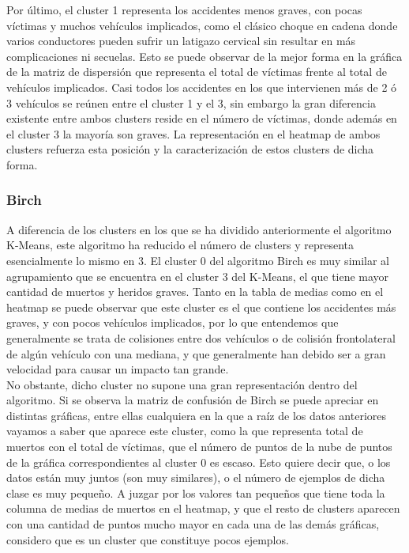 	Por último, el cluster 1 representa los accidentes menos graves, con pocas víctimas y muchos vehículos implicados, como el clásico choque en cadena donde varios conductores pueden sufrir un latigazo cervical sin resultar en más complicaciones ni secuelas. Esto se puede observar de la mejor forma en la gráfica de la matriz de dispersión que representa el total de víctimas frente al total de vehículos implicados. Casi todos los accidentes en los que intervienen más de 2 ó 3 vehículos se reúnen entre el cluster 1 y el 3, sin embargo la gran diferencia existente entre ambos clusters reside en el número de víctimas, donde además en el cluster 3 la mayoría son graves. La representación en el heatmap de ambos clusters refuerza esta posición y la caracterización de estos clusters de dicha forma.
	
	\subsubsection{Birch}
	A diferencia de los clusters en los que se ha dividido anteriormente el algoritmo K-Means, este algoritmo ha reducido el número de clusters y representa esencialmente lo mismo en 3. El cluster 0 del algoritmo Birch es muy similar al agrupamiento que se encuentra en el cluster 3 del K-Means, el que tiene mayor cantidad de muertos y heridos graves. Tanto en la tabla de medias como en el heatmap se puede observar que este cluster es el que contiene los accidentes más graves, y con pocos vehículos implicados, por lo que entendemos que generalmente se trata de colisiones entre dos vehículos o de colisión frontolateral de algún vehículo con una mediana, y que generalmente han debido ser a gran velocidad para causar un impacto tan grande.\\
	
	No obstante, dicho cluster no supone una gran representación dentro del algoritmo. Si se observa la matriz de confusión de Birch se puede apreciar en distintas gráficas, entre ellas cualquiera en la que a raíz de los datos anteriores vayamos a saber que aparece este cluster, como la que representa total de muertos con el total de víctimas, que el número de puntos de la nube de puntos de la gráfica correspondientes al cluster 0 es escaso. Esto quiere decir que, o los datos están muy juntos (son muy similares), o el número de ejemplos de dicha clase es muy pequeño. A juzgar por los valores tan pequeños que tiene toda la columna de medias de muertos en el heatmap, y que el resto de clusters aparecen con una cantidad de puntos mucho mayor en cada una de las demás gráficas, considero que es un cluster que constituye pocos ejemplos.\\
	

